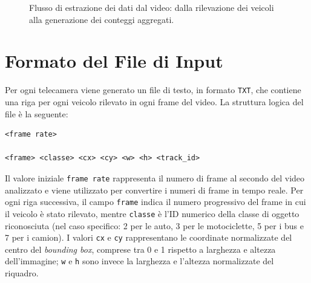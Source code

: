 \documentclass[12pt, oneside]{extbook}
\begin{document}
\begin{figure}[H]
\centering
{}

\caption{Flusso di estrazione dei dati dal video: dalla rilevazione dei veicoli alla generazione dei conteggi aggregati.}
\label{fig:flusso-video}
\end{figure}




\section{Formato del File di Input}

Per ogni telecamera viene generato un file di testo, in formato \texttt{TXT}, che contiene una riga per ogni
veicolo rilevato in ogni frame del video. La struttura logica del file è la
seguente:

\begin{verbatim}
<frame rate>

<frame> <classe> <cx> <cy> <w> <h> <track_id>
\end{verbatim}

Il valore iniziale \texttt{frame rate} rappresenta il numero di frame al
secondo del video analizzato e viene utilizzato per convertire i numeri
di frame in tempo reale. Per ogni riga successiva, il campo
\texttt{frame} indica il numero progressivo del frame in cui il
veicolo è stato rilevato, mentre \texttt{classe} è l’ID numerico della
classe di oggetto riconosciuta (nel caso specifico: 2 per le auto,
3 per le motociclette, 5 per i bus e 7 per i camion). I valori
\texttt{cx} e \texttt{cy} rappresentano le coordinate normalizzate del
centro del \emph{bounding box}, comprese tra 0 e 1 rispetto a larghezza
e altezza dell’immagine; \texttt{w} e \texttt{h} sono invece la
larghezza e l’altezza normalizzate del riquadro. 
\end{document}
